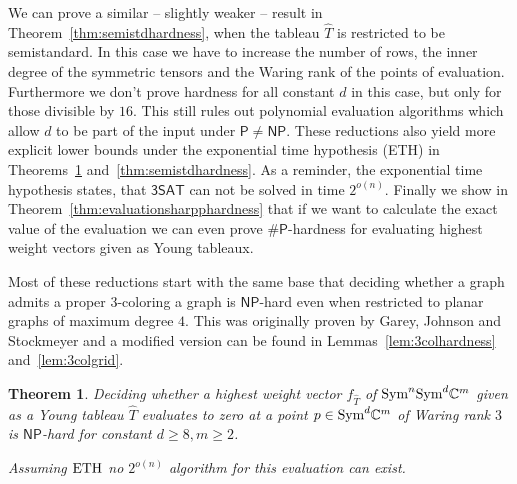 \documentclass[10pt,a4paper]{article}
\numberwithin{equation}{section}
\newtheorem{theorem}[equation]{Theorem}
\theoremstyle{definition}
\newcommand{\Sym}{\textup{Sym}}
\newcommand{\IC}{\mathbb{C}}
\newcommand{\PP}{\ensuremath{\mathsf{P}}}
\newcommand{\NP}{\ensuremath{\mathsf{NP}}}
\newcommand{\ETH}{\ensuremath{\textup{ETH}}}
\newcommand{\SAT}{\ensuremath{\mathsf{3SAT}}}
\begin{document}
We can prove a similar -- slightly weaker -- result in Theorem~\ref{thm:semistdhardness}, when the tableau $\hat{T}$ is restricted to be semistandard.
In this case we have to increase the number of rows, the inner degree of the symmetric tensors and the Waring rank of the points of evaluation.
Furthermore we don't prove hardness for all constant $d$ in this case, but only for those divisible by $16$.
This still rules out polynomial evaluation algorithms which allow $d$ to be part of the input under $\PP \neq \NP$.
These reductions also yield more explicit lower bounds under the exponential time hypothesis (ETH) in Theorems~\ref{thm:evaluationhardness} and~\ref{thm:semistdhardness}.
As a reminder, the exponential time hypothesis states, that $\SAT$ can not be solved in time $2^{o(n)}$.
Finally we show in Theorem~\ref{thm:evaluationsharpphardness} that if we want to calculate the exact value of the evaluation we can even prove $\#\PP$-hardness for evaluating highest weight vectors given as Young tableaux.

Most of these reductions start with the same base that deciding whether a graph admits a proper $3$-coloring a graph is $\NP$-hard even when restricted to planar graphs of maximum degree $4$.
This was originally proven by Garey, Johnson and Stockmeyer \cite{DBLP:journals/tcs/GareyJS76} and a modified version can be found in Lemmas~\ref{lem:3colhardness} and~\ref{lem:3colgrid}.


\begin{theorem}
    \label{thm:evaluationhardness}
    Deciding whether a highest weight vector $f_{\hat{T}}$ of $\Sym^n\Sym^d \IC^m$ given as a Young tableau $\hat{T}$ evaluates to zero at a point $p \in \Sym^d \IC^m$ of Waring rank $3$ is $\NP$-hard for constant $d \geq 8, m \geq 2$.

    Assuming $\ETH$ no $2^{o(n)}$ algorithm for this evaluation can exist.
\end{theorem}
\end{document}
